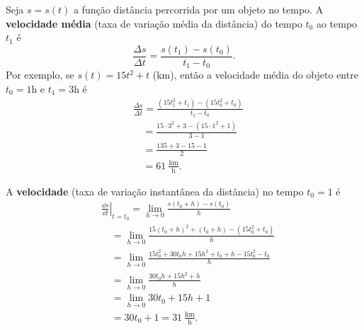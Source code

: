 \begin{ex}
  Seja $s = s(t)$ a função distância percorrida por um objeto no tempo. A {\bf velocidade média} (taxa de variação média da distância) do tempo $t_0$ ao tempo $t_1$ é
  \begin{equation}
    \frac{\Delta s}{\Delta t} = \frac{s(t_1)-s(t_0)}{t_1-t_0}.
  \end{equation}
  Por exemplo, se $s(t) = 15t^2+t$ (km), então a velocidade média do objeto entre $t_0=1$h e $t_1=3$h é
  \begin{align}
    & \frac{\Delta s}{\Delta t} = \frac{(15t_1^2+t_1)-(15t_0^2+t_0)}{t_1-t_0}\\
    & \text{}\quad = \frac{15\cdot 3^2+3-(15\cdot 1^2+1)}{3-1}\\
    & \text{}\quad = \frac{135+3-15-1}{2}\\
    & \text{}\quad = 61~\frac{\text{km}}{\text{h}}.
  \end{align}

  A {\bf velocidade} (taxa de variação instantânea da distância) no tempo $t_0=1$ é
  \begin{align}
    & \left.\frac{\dd s}{\dd t}\right|_{t=t_0} = \lim_{h\to 0} \frac{s(t_0+h)-s(t_0)}{h} \\
    & \text{}\quad = \lim_{h\to 0} \frac{15(t_0+h)^2+(t_0+h)-\left(15t_0^2+t_0\right)}{h}\\
    & \text{}\quad = \lim_{h\to 0} \frac{15t_0^2+30t_0h+15h^2+t_0+h-15t_0^2-t_0}{h}\\
    & \text{}\quad = \lim_{h\to 0} \frac{30t_0h+15h^2+h}{h}\\
    & \text{}\quad = \lim_{h\to 0} 30t_0 + 15h + 1 \\
    & \text{}\quad = 30t_0+1 = 31~\frac{\text{km}}{\text{h}}.
  \end{align}
\end{ex}

